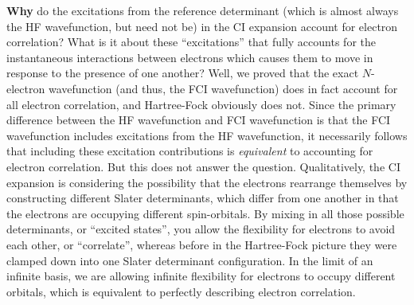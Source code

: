 \documentclass{article}
\begin{document}
\textbf{Why} do the excitations from the reference determinant (which is almost always the HF wavefunction, but need not be) in the CI expansion account for electron correlation?
What is it about these ``excitations'' that fully accounts for the instantaneous interactions between electrons which causes them to move in response to the presence of one another? 
Well, we proved that the exact $N$-electron wavefunction (and thus, the FCI wavefunction) does in fact account for all electron correlation, and Hartree-Fock obviously does not.
Since the primary difference between the HF wavefunction and FCI wavefunction is that the FCI wavefunction includes excitations from the HF wavefunction, it necessarily
follows that including these excitation contributions is \textit{equivalent} to accounting for electron correlation.
But this does not answer the question.
Qualitatively, the CI expansion is considering the possibility that the electrons rearrange themselves by constructing different Slater determinants, which differ from one another in that 
the electrons are occupying different spin-orbitals. 
By mixing in all those possible determinants, or ``excited states'', you allow the flexibility for electrons to avoid each other, or ``correlate'',
    whereas before in the Hartree-Fock picture they were clamped down into one Slater determinant configuration. 
In the limit of an infinite basis, we are allowing infinite flexibility for electrons to occupy different orbitals, which is equivalent to perfectly describing electron correlation.
\end{document}
